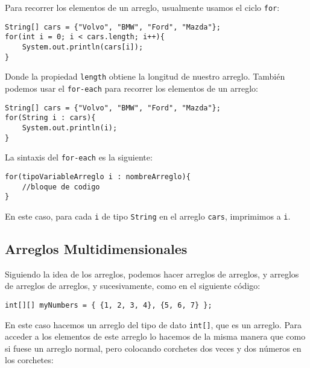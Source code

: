 \documentclass[12pt]{article}
\theoremstyle{largebreak}
\begin{document}
    Para recorrer los elementos de un arreglo, usualmente usamos el ciclo \lstinline|for|:

    \begin{lstlisting}[caption={Recorrer arreglo.},label=DescriptiveLabel]
String[] cars = {"Volvo", "BMW", "Ford", "Mazda"};
for(int i = 0; i < cars.length; i++){
    System.out.println(cars[i]);
}
    \end{lstlisting}

    Donde la propiedad \lstinline|length| obtiene la longitud de nuestro arreglo. También podemos usar el \lstinline|for-each| para recorrer los elementos de un arreglo:

    \begin{lstlisting}[caption={Recorrer arreglo con \lstinline|for-each|.},label=DescriptiveLabel]
String[] cars = {"Volvo", "BMW", "Ford", "Mazda"};
for(String i : cars){
    System.out.println(i);
}       
    \end{lstlisting}
    
    La sintaxis del \lstinline|for-each| es la siguiente: 

    \begin{lstlisting}[caption={Sintaxis \lstinline|for-each|.},label=DescriptiveLabel]
for(tipoVariableArreglo i : nombreArreglo){
    //bloque de codigo
}       
    \end{lstlisting}

    En este caso, para cada \lstinline|i| de tipo \lstinline|String| en el arreglo \lstinline|cars|, imprimimos a \lstinline|i|.

    \subsection{Arreglos Multidimensionales}

    Siguiendo la idea de los arreglos, podemos hacer arreglos de arreglos, y arreglos de arreglos de arreglos, y sucesivamente, como en el siguiente código:

    \begin{lstlisting}[caption={Arreglo Bidimensional.},label=DescriptiveLabel]
int[][] myNumbers = { {1, 2, 3, 4}, {5, 6, 7} };
    \end{lstlisting}

    En este caso hacemos un arreglo del tipo de dato \lstinline|int[]|, que es un arreglo. Para acceder a los elementos de este arreglo lo hacemos de la misma manera que como si fuese un arreglo normal, pero colocando corchetes dos veces y dos números en los corchetes:
\end{document}
